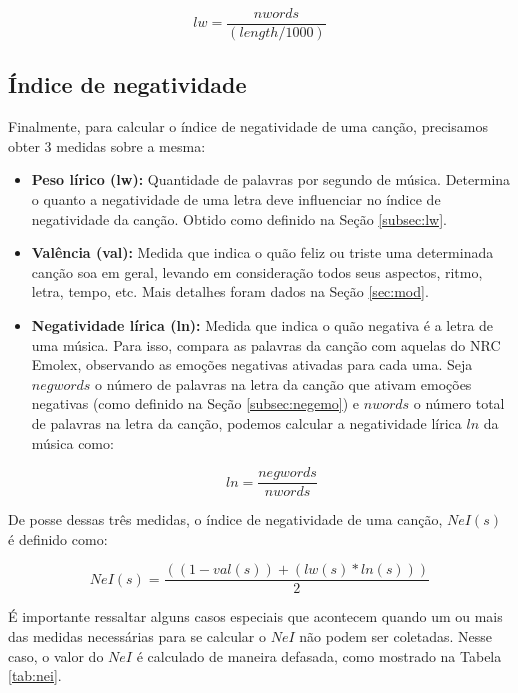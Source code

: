 \begin{displaymath}
	lw = \frac{nwords}{(length / 1000)}
\end{displaymath}

\subsection{Índice de negatividade}

Finalmente, para calcular o índice de negatividade de uma canção, 
precisamos obter 3 medidas sobre a mesma:

\begin{itemize}
	\item \textbf{Peso lírico (lw):} Quantidade de palavras por segundo de
	música. Determina o quanto a negatividade de uma letra deve
	influenciar no índice de negatividade da canção. Obtido como 
	definido na Seção \ref{subsec:lw}.

	\item \textbf{Valência (val):} Medida que indica o quão feliz ou triste
	uma determinada canção soa em geral, levando em consideração todos
	seus aspectos, ritmo, letra, tempo, etc. Mais detalhes foram dados
	na Seção \ref{sec:mod}.

	\item \textbf{Negatividade lírica (ln):} Medida que indica o quão negativa
	é a letra de uma música. Para isso, compara as palavras da canção
	com aquelas do NRC Emolex, observando as emoções negativas ativadas
	para cada uma. Seja $ negwords $ o número de palavras na letra
	da canção que ativam emoções negativas (como definido na Seção
	\ref{subsec:negemo}) e $ nwords $ o número total de palavras na 
	letra da canção, podemos calcular a negatividade lírica $ ln $
	da música como:

		\begin{displaymath}
			ln = \frac{negwords}{nwords}
		\end{displaymath}
\end{itemize}

De posse dessas três medidas, o índice de negatividade de uma canção,
$ NeI(s) $ é definido como:

\begin{displaymath}
	NeI(s) = \frac{((1 - val(s)) + (lw(s) * ln(s)))}{2}
\end{displaymath}

É importante ressaltar alguns casos especiais que acontecem quando
um ou mais das medidas necessárias para se calcular o $ NeI $ não
podem ser coletadas. Nesse caso, o valor do $ NeI $ é calculado
de maneira defasada, como mostrado na Tabela \ref{tab:nei}.


